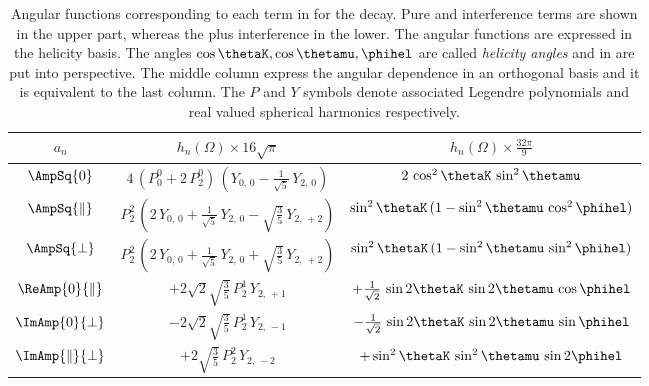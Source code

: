 \begin{table}[!h]
  \centering 
  \caption{ Angular functions corresponding to each term in  for the \BJpsiKst decay. Pure and interference \pwave terms are shown in the upper part, 
    whereas the \swave plus \spwave interference in the lower. The angular functions are expressed in the helicity basis. The angles $\cos\thetaK,\cos\thetamu,\phihel$
    are called \emph{helicity angles} and in  are put into perspective. The middle column express the angular dependence in an orthogonal basis and it
    is equivalent to the last column. The $P$ and $Y$ symbols denote associated Legendre polynomials and real valued spherical harmonics
    respectively. }
  \renewcommand{\arraystretch}{1.2}
  \label{ang_distr}
  \begin{tabular}{ccc}
    \hline
    $a_n$                             &
      $h_n(\Omega) \times 16\sqrt{\pi}$      &
      $h_n(\Omega) \times \tfrac{32\pi}{9}$  \\

    \hline
    $\AmpSq{0}$  &
      $4\, (P_0^0 + 2\, P_2^0)\, (Y_{0,\,0} - \tfrac{1}{\sqrt{5}}\, Y_{2,\,0})$  &
      $2\, \cos^2\thetaK\, \sin^2\thetamu$  \\

    $\AmpSq{\parallel}$  &
      $P_2^2\, (2\, Y_{0,\,0} + \tfrac{1}{\sqrt{5}}\, Y_{2,\,0} - \sqrt{\tfrac{3}{5}}\, Y_{2,\,+2})$  &
      $\sin^2\thetaK\, (1 - \sin^2\thetamu\, \cos^2\phihel)$  \\

    $\AmpSq{\perp}$  &
      $P_2^2\, (2\, Y_{0,\,0} + \tfrac{1}{\sqrt{5}}\, Y_{2,\,0} + \sqrt{\tfrac{3}{5}}\, Y_{2,\,+2})$  &
      $\sin^2\thetaK\, (1 - \sin^2\thetamu\, \sin^2\phihel)$  \\

    $\ReAmp{0}{\parallel}$  &
      $+2\sqrt{2}\sqrt{\tfrac{3}{5}}\, P_2^1\, Y_{2,\,+1}$  &
      $+\frac{1}{\sqrt{2}}\, \sin2\thetaK\, \sin2\thetamu\, \cos\phihel$  \\

    $\ImAmp{0}{\perp}$  &
      $-2\sqrt{2}\sqrt{\tfrac{3}{5}}\, P_2^1\, Y_{2,\,-1}$  &
      $-\frac{1}{\sqrt{2}}\, \sin2\thetaK\, \sin2\thetamu\, \sin\phihel$  \\


    $\ImAmp{\parallel}{\perp}$  &
      $+2\sqrt{\tfrac{3}{5}}\, P_2^2\, Y_{2,\,-2}$  &
      $+\sin^2\thetaK\, \sin^2\thetamu\, \sin2\phihel$  \\


\end{tabular}
\end{table}
